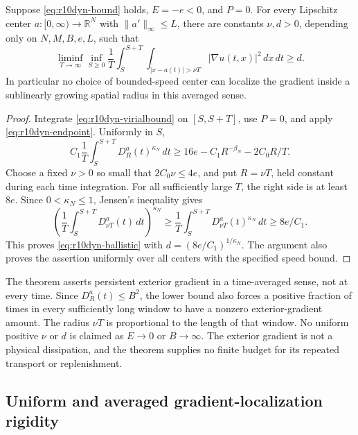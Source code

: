 \begin{theorem}
\label{thm:r10dyn-ballistic}
Suppose \eqref{eq:r10dyn-bound} holds, $E=-e<0$, and $P=0$.
For every Lipschitz center $a:[0,\infty)\to\mathbb R^N$ with
$\|a'\|_\infty\le L$, there are constants $\nu,d>0$, depending only
on $N,M,B,e,L$, such that
\begin{equation}\label{eq:r10dyn-ballistic}
 \liminf_{T\to\infty}\inf_{S\ge0}\frac1T
 \int_S^{S+T}\int_{|x-a(t)|>\nu T}|\nabla u(t,x)|^2\,dx\,dt
 \ge d.
\end{equation}
In particular no choice of bounded-speed center can localize the gradient
inside a sublinearly growing spatial radius in this averaged sense.
\end{theorem}
\begin{proof}
Integrate \eqref{eq:r10dyn-virialbound} on $[S,S+T]$, use $P=0$,
and apply \eqref{eq:r10dyn-endpoint}. Uniformly in $S$,
\begin{equation}\label{eq:r10dyn-integratedescape}
 C_1\frac1T\int_S^{S+T}D_R^a(t)^{\kappa_N}\,dt
 \ge16e-C_1R^{-\beta_N}-2C_0R/T.
\end{equation}
Choose a fixed $\nu>0$ so small that $2C_0\nu\le4e$, and put
$R=\nu T$, held constant during each time integration.
For all sufficiently large $T$, the right side is at least
$8e$. Since $0<\kappa_N\le1$, Jensen's inequality gives
\[
 \left(\frac1T\int_S^{S+T}D_{\nu T}^a(t)\,dt\right)^{\kappa_N}
 \ge\frac1T\int_S^{S+T}D_{\nu T}^a(t)^{\kappa_N}\,dt
 \ge8e/C_1.
\]
This proves \eqref{eq:r10dyn-ballistic} with
$d=(8e/C_1)^{1/\kappa_N}$. The argument also proves the assertion
uniformly over all centers with the specified speed bound.
\end{proof}

\begin{remark}
The theorem asserts persistent exterior gradient in a time-averaged sense,
not at every time. Since $D_R^a(t)\le B^2$, the lower bound also forces a
positive fraction of times in every sufficiently long window to have a
nonzero exterior-gradient amount. The radius $\nu T$ is proportional to
the length of that window. No uniform positive $\nu$ or $d$ is claimed
as $E\to0$ or $B\to\infty$. The exterior gradient is not a physical
dissipation, and the theorem supplies no finite budget for its repeated
transport or replenishment.
\end{remark}

\subsection{Uniform and averaged gradient-localization rigidity}

